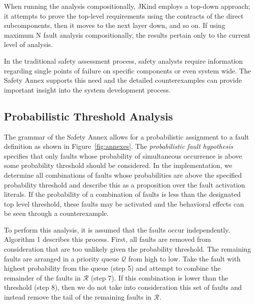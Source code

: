 When running the analysis compositionally, JKind employs a top-down approach; it attempts to prove the top-level requirements using the contracts of the direct subcomponents, then it moves to the next layer down, and so on. If using maximum N fault analysis compositionally, the results pertain only to the current level of analysis.

In the traditional safety assessment process, safety analysts require information regarding single points of failure on specific components or even system wide. The Safety Annex supports this need and the detailed counterexamples can provide important insight into the system development process. 

\subsection{Probabilistic Threshold Analysis}
The grammar of the Safety Annex allows for a probabilistic assignment to a fault definition as shown in Figure~\ref{fig:annexes}. The \textit{probabilistic fault hypothesis} specifies that only faults whose probability of simultaneous occurrence is above some probability threshold should be considered. In the implementation, we determine all combinations of faults whose probabilities are above the specified probability threshold and describe this as a proposition over the fault activation literals. If the probability of a combination of faults is less than the designated top level threshold, these faults may be activated and the behavioral effects can be seen through a counterexample.  

To perform this analysis, it is assumed that the faults occur independently. Algorithm 1 describes this process. First, all faults are removed from consideration that are too unlikely given the probability threshold. The remaining faults are arranged in a priority queue $\mathcal{Q}$ from high to low. Take the fault with highest probability from the queue (step 5) and attempt to combine the remainder of the faults in $\mathcal{R}$ (step 7). If this combination is lower than the threshold (step 8), then we do not take into consideration this set of faults and instead remove the tail of the remaining faults in $\mathcal{R}$. %
 
